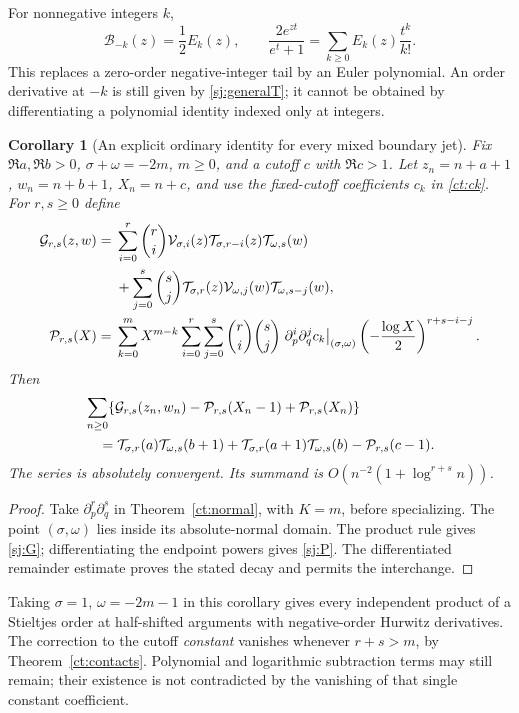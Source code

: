 \documentclass[11pt,letterpaper]{article}
\numberwithin{equation}{section}
\newtheorem{corollary}[theorem]{Corollary}
\theoremstyle{definition}
\theoremstyle{remark}
\begin{document}
For nonnegative integers \(k\),
\[
 \mathcal B_{-k}(z)=\frac12E_k(z),
 \qquad
 \frac{2e^{zt}}{e^t+1}=\sum_{k\ge0}E_k(z)\frac{t^k}{k!}.
\]
This replaces a zero-order negative-integer tail by an Euler polynomial.
An order derivative at \(-k\) is still given by
\eqref{sj:generalT}; it cannot be obtained by differentiating a polynomial
identity indexed only at integers.

\begin{corollary}[An explicit ordinary identity for every mixed boundary jet]
\label{sj:allboundary}
Fix \(\Re a,\Re b>0\), \(\sigma+\omega=-2m\), \(m\ge0\), and a cutoff \(c\) with
\(\Re c>1\). Let \(z_n=n+a+1\), \(w_n=n+b+1\), \(X_n=n+c\),
and use the fixed-cutoff coefficients \(c_k\) in \eqref{ct:ck}.
For \(r,s\ge0\) define
\begin{align}
 \mathcal G_{r,s}(z,w)
 ={}&\sum_{i=0}^r\binom ri
    \mathcal V_{\sigma,i}(z)
    \mathcal T_{\sigma,r-i}(z)\mathcal T_{\omega,s}(w)\notag\\
 &+\sum_{j=0}^s\binom sj
    \mathcal T_{\sigma,r}(z)\mathcal V_{\omega,j}(w)
    \mathcal T_{\omega,s-j}(w),\label{sj:G}\\
 \mathcal P_{r,s}(X)
 ={}&\sum_{k=0}^m X^{m-k}
   \sum_{i=0}^r\sum_{j=0}^s
       \binom ri\binom sj
       \left.\partial_p^i\partial_q^jc_k\right|_{(\sigma,\omega)}
       \left(-\frac{\log X}{2}\right)^{r+s-i-j}.
       \label{sj:P}
\end{align}
Then
\begin{align}
 &\sum_{n\ge0}
   \{\mathcal G_{r,s}(z_n,w_n)
          -\mathcal P_{r,s}(X_n-1)+\mathcal P_{r,s}(X_n)\}
       \notag\\
 &\quad=
 \mathcal T_{\sigma,r}(a)\mathcal T_{\omega,s}(b+1)
 +\mathcal T_{\sigma,r}(a+1)\mathcal T_{\omega,s}(b)
 -\mathcal P_{r,s}(c-1).
 \label{sj:ordinary}
\end{align}
The series is absolutely convergent. Its summand is
\(O(n^{-2}(1+\log^{r+s}n))\).
\end{corollary}

\begin{proof}
Take \(\partial_p^r\partial_q^s\) in
Theorem~\ref{ct:normal}, with \(K=m\), before specializing.
The point \((\sigma,\omega)\) lies inside its absolute-normal domain.
The product rule gives \eqref{sj:G}; differentiating the endpoint powers
gives \eqref{sj:P}. The differentiated remainder estimate proves the stated
decay and permits the interchange.
\end{proof}

Taking \(\sigma=1\), \(\omega=-2m-1\) in this corollary gives every
independent product of a Stieltjes order at half-shifted arguments with
negative-order Hurwitz derivatives. The correction to the cutoff
\emph{constant} vanishes whenever \(r+s>m\), by
Theorem~\ref{ct:contacts}. Polynomial and logarithmic subtraction terms may
still remain; their existence is not contradicted by the vanishing of that
single constant coefficient.
\end{document}
